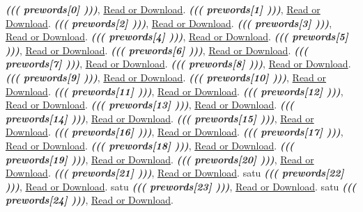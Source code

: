 \documentclass{article}
\begin{document}
\begin{thebibliography}{99}

\emph{\textbf{((( prewords[0] )))}}, \href{((( lander[0] ))) }{Read or Download}.
\emph{\textbf{((( prewords[1] )))}}, \href{((( lander[1] )))}{Read or Download}.
\emph{\textbf{((( prewords[2] )))}}, \href{((( lander[2] )))}{Read or Download}.
\emph{\textbf{((( prewords[3] )))}}, \href{((( lander[3] )))}{Read or Download}.
\emph{\textbf{((( prewords[4] )))}}, \href{((( lander[4] )))}{Read or Download}.
\emph{\textbf{((( prewords[5] )))}}, \href{((( lander[5] )))}{Read or Download}.
\emph{\textbf{((( prewords[6] )))}}, \href{((( lander[6] )))}{Read or Download}.
\emph{\textbf{((( prewords[7] )))}}, \href{((( lander[7] )))}{Read or Download}.
\emph{\textbf{((( prewords[8] )))}}, \href{((( lander[8] )))}{Read or Download}.
\emph{\textbf{((( prewords[9] )))}}, \href{((( lander[9] )))}{Read or Download}.
\emph{\textbf{((( prewords[10] )))}}, \href{((( lander[10] )))}{Read or Download}.
\emph{\textbf{((( prewords[11] )))}}, \href{((( lander[11] )))}{Read or Download}.
\emph{\textbf{((( prewords[12] )))}}, \href{((( lander[12] )))}{Read or Download}.
\emph{\textbf{((( prewords[13] )))}}, \href{((( lander[13] )))}{Read or Download}.
\emph{\textbf{((( prewords[14] )))}}, \href{((( lander[14] )))}{Read or Download}.
\emph{\textbf{((( prewords[15] )))}}, \href{((( lander[15] )))}{Read or Download}.
\emph{\textbf{((( prewords[16] )))}}, \href{((( lander[16] )))}{Read or Download}.
\emph{\textbf{((( prewords[17] )))}}, \href{((( lander[17] )))}{Read or Download}.
\emph{\textbf{((( prewords[18] )))}}, \href{((( lander[18] )))}{Read or Download}.
\emph{\textbf{((( prewords[19] )))}}, \href{((( lander[19] )))}{Read or Download}.
\emph{\textbf{((( prewords[20] )))}}, \href{((( lander[20] )))}{Read or Download}.
\emph{\textbf{((( prewords[21] )))}}, \href{((( lander[21] )))}{Read or Download}.
satu
\emph{\textbf{((( prewords[22] )))}}, \href{((( lander[22] )))}{Read or Download}.
satu
\emph{\textbf{((( prewords[23] )))}}, \href{((( lander[23] )))}{Read or Download}.
satu
\emph{\textbf{((( prewords[24] )))}}, \href{((( lander[24] )))}{Read or Download}.

\end{thebibliography}
\end{document}
